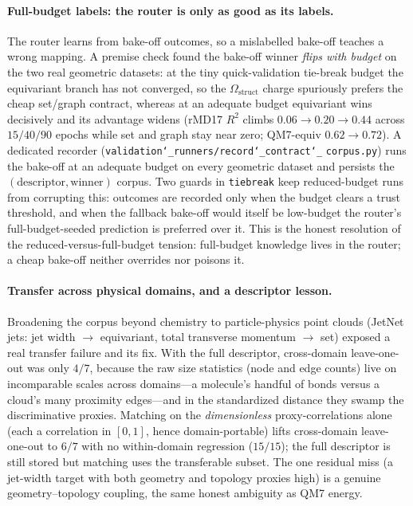 \documentclass[11pt]{article}
\newcommand{\allowbreakhere}{\discretionary{}{}{}}
\newcommand{\code}[1]{\texttt{\def\_{\char`_\allowbreakhere}#1}}
\begin{document}
\paragraph{Full-budget labels: the router is only as good as its labels.} The router learns from bake-off
outcomes, so a mislabelled bake-off teaches a wrong mapping. A premise check found the bake-off winner
\emph{flips with budget} on the two real geometric datasets: at the tiny quick-validation tie-break budget
the equivariant branch has not converged, so the $\Omega_{\mathrm{struct}}$ charge spuriously prefers the
cheap set/graph contract, whereas at an adequate budget equivariant wins decisively and its advantage
widens (rMD17 $R^2$ climbs $0.06\to0.20\to0.44$ across $15/40/90$ epochs while set and graph stay near
zero; QM7-equiv $0.62\to0.72$). A dedicated recorder (\code{validation\_runners/record\_contract\_}
\code{corpus.py}) runs the bake-off at an adequate budget on every geometric dataset and persists the
$(\text{descriptor},\text{winner})$ corpus. Two guards in \code{tiebreak} keep reduced-budget runs from
corrupting this: outcomes are recorded only when the budget clears a trust threshold, and when the
fallback bake-off would itself be low-budget the router's full-budget-seeded prediction is preferred over
it. This is the honest resolution of the reduced-versus-full-budget tension: full-budget knowledge lives
in the router; a cheap bake-off neither overrides nor poisons it.

\paragraph{Transfer across physical domains, and a descriptor lesson.} Broadening the corpus beyond
chemistry to particle-physics point clouds (JetNet jets: jet width $\to$ equivariant, total transverse
momentum $\to$ set) exposed a real transfer failure and its fix. With the full descriptor, cross-domain
leave-one-out was only $4/7$, because the raw size statistics (node and edge counts) live on incomparable
scales across domains---a molecule's handful of bonds versus a cloud's many proximity edges---and in the
standardized distance they swamp the discriminative proxies. Matching on the \emph{dimensionless}
proxy-correlations alone (each a correlation in $[0,1]$, hence domain-portable) lifts cross-domain
leave-one-out to $6/7$ with no within-domain regression ($15/15$); the full descriptor is still stored but
matching uses the transferable subset. The one residual miss (a jet-width target with both geometry and
topology proxies high) is a genuine geometry--topology coupling, the same honest ambiguity as QM7 energy.
\end{document}
